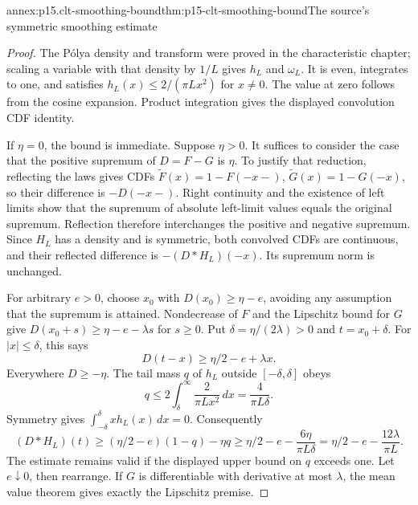 \begin{annexitem}{annex:p15.clt-smoothing-bound}{thm:p15-clt-smoothing-bound}{The source's symmetric smoothing estimate}
\begin{proof}
The Pólya density and transform were proved in the characteristic
chapter; scaling a variable with that density by \(1/L\)
gives \(h_L\) and \(\omega_L\). It is even, integrates to one,
and satisfies \(h_L(x)\leq2/(\pi Lx^2)\) for \(x\ne0\).
The value at zero follows from the cosine expansion.
Product integration gives the displayed convolution CDF identity.

If \(\eta=0\), the bound is immediate. Suppose \(\eta>0\).
It suffices to consider the case that the positive supremum of
\(D=F-G\) is \(\eta\).
To justify that reduction, reflecting the laws gives CDFs
\(\widetilde F(x)=1-F(-x-)\),
\(\widetilde G(x)=1-G(-x)\), so their difference is
\(-D(-x-)\). Right continuity and the existence of left limits
show that the supremum of absolute left-limit values equals
the original supremum. Reflection therefore interchanges the
positive and negative supremum. Since \(H_L\) has a density
and is symmetric, both convolved CDFs are continuous, and their
reflected difference is \(-(D*H_L)(-x)\). Its supremum norm
is unchanged.

For arbitrary \(e>0\), choose \(x_0\) with
\(D(x_0)\geq\eta-e\), avoiding any assumption that the supremum
is attained. Nondecrease of \(F\) and the Lipschitz bound for \(G\)
give \(D(x_0+s)\geq\eta-e-\lambda s\) for \(s\geq0\).
Put \(\delta=\eta/(2\lambda)>0\) and \(t=x_0+\delta\).
For \(|x|\leq\delta\), this says
\[
 D(t-x)\geq\eta/2-e+\lambda x.
 \]
Everywhere \(D\geq-\eta\). The tail mass \(q\) of \(h_L\)
outside \([-\delta,\delta]\) obeys
\[
 q\leq2\int_\delta^\infty\frac{2}{\pi Lx^2}\,dx
                          =\frac4{\pi L\delta}.
 \]
Symmetry gives \(\int_{-\delta}^{\delta}xh_L(x)\,dx=0\).
Consequently
\[
 (D*H_L)(t)
 \geq(\eta/2-e)(1-q)-\eta q
 \geq\eta/2-e-\frac{6\eta}{\pi L\delta}
 =\eta/2-e-\frac{12\lambda}{\pi L}.
 \]
The estimate remains valid if the displayed upper bound on \(q\)
exceeds one. Let \(e\downarrow0\), then rearrange.
If \(G\) is differentiable with derivative at most \(\lambda\),
the mean value theorem gives exactly the Lipschitz premise.
\end{proof}
\end{annexitem}


